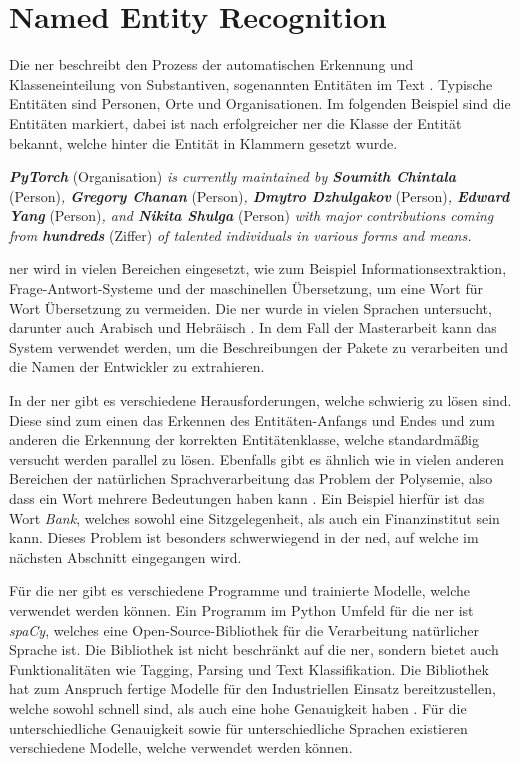 \section{Named Entity Recognition}
\label{sec:named-entity-recognition}
Die \gls{ner} beschreibt den Prozess der automatischen Erkennung und Klasseneinteilung von Substantiven, sogenannten Entitäten im Text \autocite{mohit_named_2014}.
Typische Entitäten sind Personen, Orte und Organisationen.
Im folgenden Beispiel sind die Entitäten markiert, dabei ist nach erfolgreicher \gls{ner} die Klasse der Entität bekannt, welche hinter die Entität in Klammern gesetzt wurde.

\begin{addmargin}[25pt]{0pt}
    \textit{\textbf{PyTorch}} (Organisation) \textit{is currently maintained by \textbf{Soumith Chintala}} (Person)\textit{, \textbf{Gregory Chanan}} (Person)\textit{, \textbf{Dmytro Dzhulgakov}} (Person)\textit{, \textbf{Edward Yang}} (Person)\textit{, and \textbf{Nikita Shulga}} (Person) \textit{with major contributions coming from \textbf{hundreds}} (Ziffer) \textit{of talented individuals in various forms and means.}
\end{addmargin}

\gls{ner} wird in vielen Bereichen eingesetzt, wie zum Beispiel Informationsextraktion, Frage-Antwort-Systeme und der maschinellen Übersetzung, um eine Wort für Wort Übersetzung zu vermeiden.
Die \gls{ner} wurde in vielen Sprachen untersucht, darunter auch Arabisch und Hebräisch \autocite{mohit_named_2014}.
In dem Fall der Masterarbeit kann das System verwendet werden, um die Beschreibungen der Pakete zu verarbeiten und die Namen der Entwickler zu extrahieren.

In der \gls{ner} gibt es verschiedene Herausforderungen, welche schwierig zu lösen sind.
Diese sind zum einen das Erkennen des Entitäten-Anfangs und Endes und zum anderen die Erkennung der korrekten Entitätenklasse, welche standardmäßig versucht werden parallel zu lösen.
Ebenfalls gibt es ähnlich wie in vielen anderen Bereichen der natürlichen Sprachverarbeitung das Problem der Polysemie, also dass ein Wort mehrere Bedeutungen haben kann \autocite{mohit_named_2014}.
Ein Beispiel hierfür ist das Wort \textit{Bank}, welches sowohl eine Sitzgelegenheit, als auch ein Finanzinstitut sein kann.
Dieses Problem ist besonders schwerwiegend in der \gls{ned}, auf welche im nächsten Abschnitt eingegangen wird.

Für die \gls{ner} gibt es verschiedene Programme und trainierte Modelle, welche verwendet werden können.
Ein Programm im Python Umfeld für die \gls{ner} ist \textit{spaCy}, welches eine Open-Source-Bibliothek für die Verarbeitung natürlicher Sprache ist.
Die Bibliothek ist nicht beschränkt auf die \gls{ner}, sondern bietet auch Funktionalitäten wie Tagging, Parsing und Text Klassifikation.
Die Bibliothek hat zum Anspruch fertige Modelle für den Industriellen Einsatz bereitzustellen, welche sowohl schnell sind, als auch eine hohe Genauigkeit haben \autocite{honnibal_spacy_2020}.
Für die unterschiedliche Genauigkeit sowie für unterschiedliche Sprachen existieren verschiedene Modelle, welche verwendet werden können.
